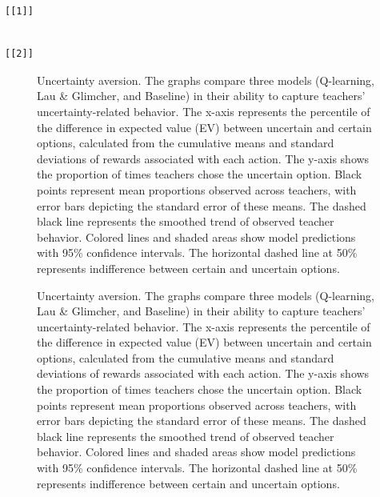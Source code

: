 \documentclass[
  number,
  preprint,
  3p,
  onecolumn]{elsarticle}
\begin{document}
\begin{verbatim}
[[1]]
\end{verbatim}

\begin{verbatim}

[[2]]
\end{verbatim}

\begin{figure}


\caption{\label{fig-uncertainty-aversion-1}Uncertainty aversion. The
graphs compare three models (Q-learning, Lau \& Glimcher, and Baseline)
in their ability to capture teachers' uncertainty-related behavior. The
x-axis represents the percentile of the difference in expected value
(EV) between uncertain and certain options, calculated from the
cumulative means and standard deviations of rewards associated with each
action. The y-axis shows the proportion of times teachers chose the
uncertain option. Black points represent mean proportions observed
across teachers, with error bars depicting the standard error of these
means. The dashed black line represents the smoothed trend of observed
teacher behavior. Colored lines and shaded areas show model predictions
with 95\% confidence intervals. The horizontal dashed line at 50\%
represents indifference between certain and uncertain options.}

\end{figure}%

\begin{figure}


\caption{\label{fig-uncertainty-aversion-2}Uncertainty aversion. The
graphs compare three models (Q-learning, Lau \& Glimcher, and Baseline)
in their ability to capture teachers' uncertainty-related behavior. The
x-axis represents the percentile of the difference in expected value
(EV) between uncertain and certain options, calculated from the
cumulative means and standard deviations of rewards associated with each
action. The y-axis shows the proportion of times teachers chose the
uncertain option. Black points represent mean proportions observed
across teachers, with error bars depicting the standard error of these
means. The dashed black line represents the smoothed trend of observed
teacher behavior. Colored lines and shaded areas show model predictions
with 95\% confidence intervals. The horizontal dashed line at 50\%
represents indifference between certain and uncertain options.}

\end{figure}%
\end{document}
